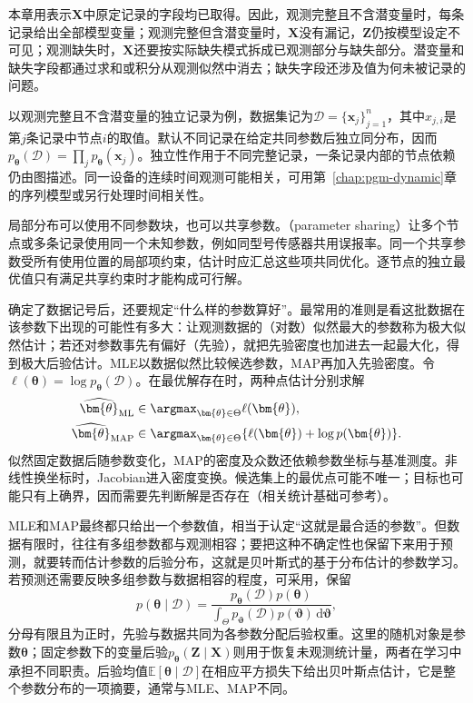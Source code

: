 本章用表示$\bm{X}$中原定记录的字段均已取得。因此，观测完整且不含潜变量时，每条记录给出全部模型变量；观测完整但含潜变量时，$\bm{X}$没有漏记，$\bm{Z}$仍按模型设定不可见；观测缺失时，$\bm{X}$还要按实际缺失模式拆成已观测部分与缺失部分。潜变量和缺失字段都通过求和或积分从观测似然中消去；缺失字段还涉及值为何未被记录的问题。

以观测完整且不含潜变量的独立记录为例，数据集记为$\mathcal{D}=\{\bm{x}_j\}_{j=1}^n$，其中$x_{j,i}$是第$j$条记录中节点$i$的取值。默认不同记录在给定共同参数后独立同分布，因而$p_{\bm{\theta}}(\mathcal{D})=\prod_jp_{\bm{\theta}}(\bm{x}_j)$。独立性作用于不同完整记录，一条记录内部的节点依赖仍由图描述。同一设备的连续时间观测可能相关，可用第~\ref{chap:pgm-dynamic}章的序列模型或另行处理时间相关性。

局部分布可以使用不同参数块，也可以共享参数。（parameter sharing）让多个节点或多条记录使用同一个未知参数，例如同型号传感器共用误报率。同一个共享参数受所有使用位置的局部项约束，估计时应汇总这些项共同优化。逐节点的独立最优值只有满足共享约束时才能构成可行解。

确定了数据记号后，还要规定“什么样的参数算好”。最常用的准则是看这批数据在该参数下出现的可能性有多大：让观测数据的（对数）似然最大的参数称为极大似然估计；若还对参数事先有偏好（先验），就把先验密度也加进去一起最大化，得到极大后验估计。MLE以数据似然比较候选参数，MAP再加入先验密度。令$\ell(\bm{\theta})=\log p_{\bm{\theta}}(\mathcal{D})$。在最优解存在时，两种点估计分别求解
\begin{equation}
  \begin{aligned}
    \widehat{\bm{\theta}}_{\mathrm{ML}}
      &\in\argmax_{\bm{\theta}\in\Theta}\ell(\bm{\theta}),\\
    \widehat{\bm{\theta}}_{\mathrm{MAP}}
      &\in\argmax_{\bm{\theta}\in\Theta}
        \{\ell(\bm{\theta})+\log p(\bm{\theta})\}.
  \end{aligned}
  \label{eq:pgm-parameter-learning-point-objectives}
\end{equation}
似然固定数据后随参数变化，MAP的密度及众数还依赖参数坐标与基准测度。非线性换坐标时，Jacobian进入密度变换。候选集上的最优点可能不唯一；目标也可能只有上确界，因而需要先判断解是否存在（相关统计基础可参考）。

MLE和MAP最终都只给出一个参数值，相当于认定“这就是最合适的参数”。但数据有限时，往往有多组参数都与观测相容；要把这种不确定性也保留下来用于预测，就要转而估计参数的后验分布，这就是贝叶斯式的基于分布估计的参数学习。若预测还需要反映多组参数与数据相容的程度，可采用，保留
\begin{equation}
  p(\bm{\theta}\mid\mathcal{D})
  =\frac{p_{\bm{\theta}}(\mathcal{D})p(\bm{\theta})}
  {\int_\Theta p_{\bm{\vartheta}}(\mathcal{D})
    p(\bm{\vartheta})\,\mathrm{d}\bm{\vartheta}},
  \label{eq:pgm-parameter-learning-parameter-posterior}
\end{equation}
分母有限且为正时，先验与数据共同为各参数分配后验权重。这里的随机对象是参数$\bm{\theta}$；固定参数下的变量后验$p_{\bm{\theta}}(\bm{Z}\mid\bm{X})$则用于恢复未观测统计量，两者在学习中承担不同职责。后验均值$\mathbb{E}[\bm{\theta}\mid\mathcal{D}]$在相应平方损失下给出贝叶斯点估计，它是整个参数分布的一项摘要，通常与MLE、MAP不同。

